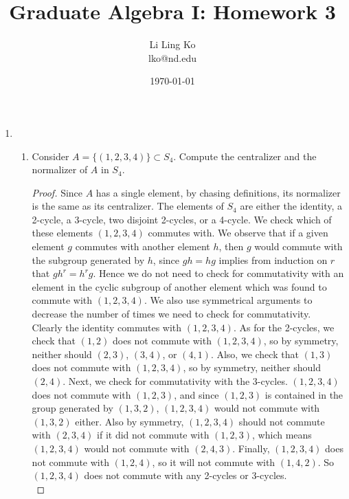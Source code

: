 \documentclass{article}
\begin{document}
\title{Graduate Algebra I: Homework 3}
\author{Li Ling Ko\\ lko@nd.edu}
\date{\today}
\maketitle

\begin{enumerate}
  \item
    \begin{enumerate}
      \item Consider $A=\{(1,2,3,4)\}\subset S_4$. Compute the centralizer
        and the normalizer of $A$ in $S_4$.

        \begin{proof}
          Since $A$ has a single element, by chasing definitions, its
          normalizer is the same as its centralizer.
          The elements of $S_4$ are either the identity, a 2-cycle, a
          3-cycle, two disjoint 2-cycles, or a 4-cycle. We check which of
          these elements $(1,2,3,4)$ commutes with. We observe that if a
          given element $g$ commutes with another element $h$, then $g$
          would commute with the subgroup generated by $h$, since $gh=hg$
          implies from induction on $r$ that $gh^r=h^rg$. Hence we do not
          need to check for commutativity with an element in the cyclic
          subgroup of another element which was found to commute with
          $(1,2,3,4)$. We also use symmetrical arguments to decrease the
          number of times we need to check for commutativity. \\

          Clearly the identity commutes with $(1,2,3,4)$. As for the
          2-cycles, we check that $(1,2)$ does not commute with
          $(1,2,3,4)$, so by symmetry, neither should $(2,3)$, $(3,4)$, or
          $(4,1)$. Also, we check that $(1,3)$ does not commute with
          $(1,2,3,4)$, so by symmetry, neither should $(2,4)$. Next, we
          check for commutativity with the 3-cycles. $(1,2,3,4)$ does not
          commute with $(1,2,3)$, and since $(1,2,3)$ is contained in the
          group generated by $(1,3,2)$, $(1,2,3,4)$ would not commute with
          $(1,3,2)$ either. Also by symmetry, $(1,2,3,4)$ should not
          commute with $(2,3,4)$ if it did not commute with $(1,2,3)$,
          which means $(1,2,3,4)$ would not commute with $(2,4,3)$.
          Finally, $(1,2,3,4)$ does not commute with $(1,2,4)$, so it will
          not commute with $(1,4,2)$. So $(1,2,3,4)$ does not commute with
          any 2-cycles or 3-cycles. \\


\end{proof}
\end{enumerate}
\end{enumerate}
\end{document}
